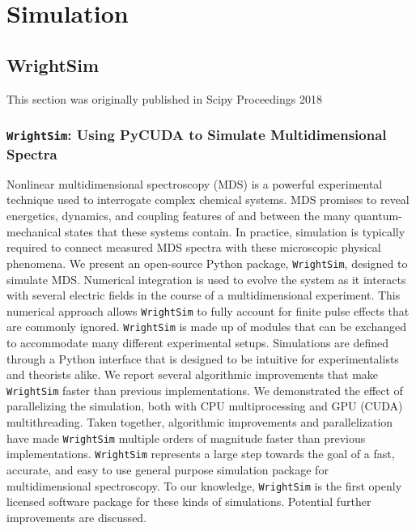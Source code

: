 \chapter{Simulation} \label{cha:sim}

\clearpage

\section{WrightSim}  %

This section was originally published in Scipy Proceedings 2018 \cite{SundenKyleFoster2018a}

\hypertarget{wrightsim-using-pycuda-to-simulate-multidimensional-spectra}{%
\subsection{\texorpdfstring{\texttt{WrightSim}: Using PyCUDA to Simulate
Multidimensional
Spectra}{WrightSim: Using PyCUDA to Simulate Multidimensional Spectra}}\label{wrightsim-using-pycuda-to-simulate-multidimensional-spectra}}

Nonlinear multidimensional spectroscopy (MDS) is a powerful experimental
technique used to interrogate complex chemical systems. MDS promises to
reveal energetics, dynamics, and coupling features of and between the
many quantum-mechanical states that these systems contain. In practice,
simulation is typically required to connect measured MDS spectra with
these microscopic physical phenomena. We present an open-source Python
package, \texttt{WrightSim}, designed to simulate MDS. Numerical
integration is used to evolve the system as it interacts with several
electric fields in the course of a multidimensional experiment. This
numerical approach allows \texttt{WrightSim} to fully account for finite
pulse effects that are commonly ignored. \texttt{WrightSim} is made up
of modules that can be exchanged to accommodate many different
experimental setups. Simulations are defined through a Python interface
that is designed to be intuitive for experimentalists and theorists
alike. We report several algorithmic improvements that make
\texttt{WrightSim} faster than previous implementations. We demonstrated
the effect of parallelizing the simulation, both with CPU
multiprocessing and GPU (CUDA) multithreading. Taken together,
algorithmic improvements and parallelization have made
\texttt{WrightSim} multiple orders of magnitude faster than previous
implementations. \texttt{WrightSim} represents a large step towards the
goal of a fast, accurate, and easy to use general purpose simulation
package for multidimensional spectroscopy. To our knowledge,
\texttt{WrightSim} is the first openly licensed software package for
these kinds of simulations. Potential further improvements are
discussed.

